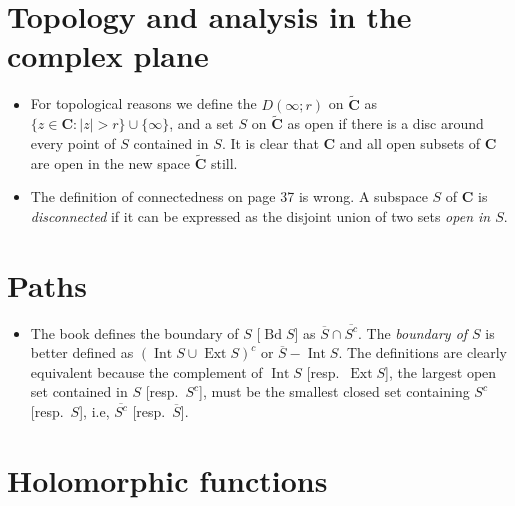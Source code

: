 \documentclass[11pt]{article}
\newcommand{\df}[1]{\textit{\textsf{#1}}} %
\newcommand{\C}{\mathbf{C}}
\newcommand{\eC}{\widetilde{\C}}
\newcommand{\Bd}{\operatorname{Bd}}
\newcommand{\clos}[1]{\overline{#1}}
\newcommand{\nm}[1]{\lVert #1 \rVert}
\newcommand{\abs}[1]{\lvert #1 \rvert}
\renewcommand{\mathbf}{\boldsymbol}
\begin{document}
\section{Topology and analysis in the complex plane}
\begin{itemize}
    \item For topological reasons we define the $D(\infty; r)$ on $\eC$ as $\{z \in \C : \abs{z} > r\} \cup \{\infty\}$, and a set $S$ on $\eC$ as open if there is a disc around every point of $S$ contained in $S$. It is clear that $\C$ and all open subsets of $\C$ are open in the new space $\eC$ still.
    \item The definition of connectedness on page 37 is wrong. A subspace $S$ of $\C$ is \df{disconnected} if it can be expressed as the disjoint union of two  sets \textit{open in $S$}.
    
\end{itemize}

\section{Paths}
\begin{itemize}
    \item The book defines the boundary of $S$ [$\Bd S$] as $\clos{S} \cap \clos{S^c}$. The \df{boundary of $S$} is better defined as $(\operatorname{Int} S \cup \operatorname{Ext} S)^c$ or $\clos{S}-\operatorname{Int} S$. The definitions are clearly equivalent because the complement of $\operatorname{Int} S$ [resp.\ $\operatorname{Ext} S$], the largest open set contained in $S$ [resp.\ $S^c$], must be the smallest closed set containing $S^c$ [resp.\ $S$], i.e, $\clos{S^c}$ [resp.\ $\clos{S}$].
\end{itemize}

\section{Holomorphic functions}
\end{document}
